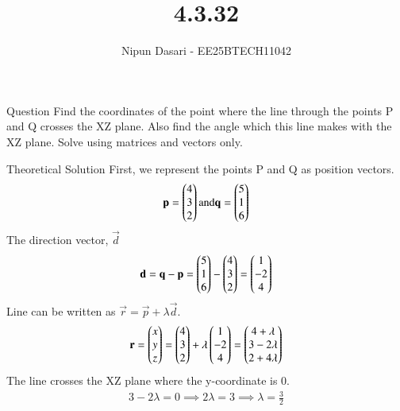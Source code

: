 \documentclass{beamer}
\title %
{4.3.32}
\author %
{Nipun Dasari - EE25BTECH11042}
\begin{document}
	
	\frame{\titlepage}
	\begin{frame}{Question}
		Find the coordinates of the point where the line through the points P and Q crosses the XZ plane. Also find the angle which this line makes with the XZ plane. Solve using matrices and vectors only.
	\end{frame}
	
	
	\begin{frame}{Theoretical Solution}
	First, we represent the points P and Q as position vectors.
	\begin{align}
		\mathbf{p} = \begin{pmatrix}4 \\ 3 \\ 2\end{pmatrix}  \text{and}  \mathbf{q} = \begin{pmatrix}5 \\ 1 \\ 6\end{pmatrix}
	\end{align}
	The direction vector, $\vec{d}$
	\begin{align}
		\mathbf{d} = \mathbf{q} - \mathbf{p} = \begin{pmatrix}5 \\ 1 \\ 6\end{pmatrix} - \begin{pmatrix}4 \\ 3 \\ 2\end{pmatrix} = \begin{pmatrix}1 \\ -2 \\ 4\end{pmatrix}
	\end{align}
	Line can be written as $\vec{r} = \vec{p} + \lambda \vec{d}$.
	\begin{align}
		\mathbf{r} = \begin{pmatrix}x \\ y \\ z\end{pmatrix} = \begin{pmatrix}4 \\ 3 \\ 2\end{pmatrix} + \lambda \begin{pmatrix}1 \\ -2 \\ 4\end{pmatrix} = \begin{pmatrix}4 + \lambda \\ 3 - 2\lambda \\ 2 + 4\lambda\end{pmatrix}
	\end{align}
	The line crosses the XZ plane where the y-coordinate is 0.
	\begin{align}
		3 - 2\lambda = 0 \implies 2\lambda = 3 \implies \lambda = \frac{3}{2} \label{0.4}
	\end{align}
	
	\end{frame}
\end{document}
